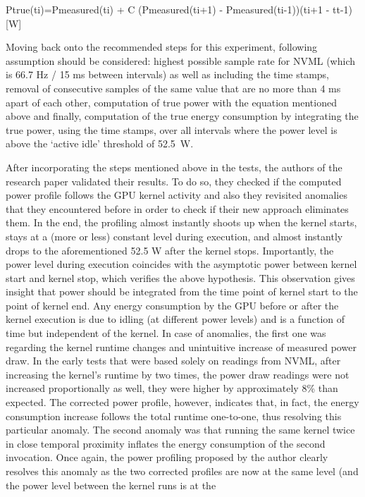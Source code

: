 Ptrue(ti)=Pmeasured(ti) + C  (Pmeasured(ti+1) {-} Pmeasured(ti-1))(ti+1 {-} tt-1)    [W]

Moving back onto the recommended steps for this experiment,
following assumption should be considered: highest possible sample
rate for NVML (which is 66.7 Hz / 15 ms between intervals) as well
as including the time stamps, removal of consecutive samples of
the same value that are no more than 4 ms apart of each other,
computation of true power with the equation mentioned above and
finally, computation of the true energy consumption by integrating
the true power, using the time stamps, over all intervals where
the power level is above the `active idle' threshold of 52.5~W.

After incorporating the steps mentioned above in the tests, the
authors of the research paper validated their results. To do so,
they checked if the computed power profile follows the GPU kernel
activity and also they revisited anomalies that they encountered
before in order to check if their new approach eliminates them.
In the end, the profiling almost instantly shoots up when the
kernel starts, stays at a (more or less) constant level during
execution, and almost instantly drops to the aforementioned 52.5 W
after the kernel stops. Importantly, the power level during
execution coincides with the asymptotic power between kernel start
and kernel stop, which verifies the above hypothesis. This
observation gives insight that power should be integrated from the
time point of kernel start to the point of kernel end. Any energy
consumption by the GPU before or after the kernel execution is due
to idling (at different power levels) and is a function of time
but independent of the kernel. In case of anomalies, the first one
was regarding the kernel runtime changes and unintuitive increase
of measured power draw. In the early tests that were based solely
on readings from NVML, after increasing the kernel's runtime by
two times, the power draw readings were not increased
proportionally as well, they were higher by approximately 8\% than
expected. The corrected power profile, however, indicates that, in
fact, the energy consumption increase follows the total runtime
one-to-one, thus resolving this particular anomaly. The second
anomaly was that running the same kernel twice in close temporal
proximity inflates the energy consumption of the second invocation.
Once again, the power profiling proposed by the author clearly
resolves this anomaly as the two corrected profiles are now at the
same level (and the power level between the kernel runs is at the
